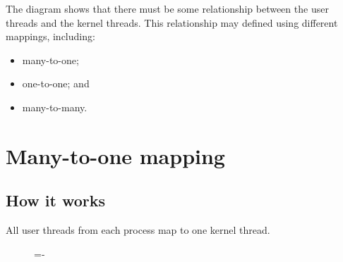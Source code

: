 \documentclass[a4paper]{systems-software}
\begin{document}
The diagram shows that there must be some relationship between the user threads and the kernel threads. This relationship may defined using different mappings, including:
\begin{itemize}
	\item many-to-one;
	\item one-to-one; and
	\item many-to-many.
\end{itemize}


\newpage

\section*{Many-to-one mapping}

\subsection*{How it works}

All user threads from each process map to one kernel thread.

\begin{figure}[H]
  \lineskip=-\fboxrule
\end{figure}
\end{document}
